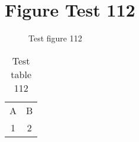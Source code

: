 \documentclass{article}
\begin{document}
\section{Figure Test 112}
\begin{figure}[h]
\caption{Test figure 112}
\end{figure}
\begin{table}[h]
\caption{Test table 112}
\begin{tabular}{cc}
A & B \\
1 & 2
\end{tabular}
\end{table}
\end{document}
